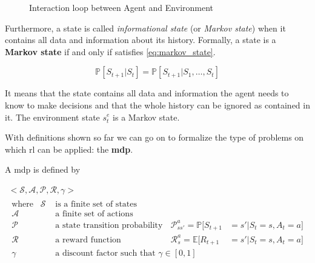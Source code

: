 \begin{figure}
	\centering
	\caption[Interaction loop between Agent and Environment]{Interaction loop between Agent and Environment}
	\label{fig:interactionsAE}
\end{figure}


Furthermore, a state is called \textit{informational state} (or \textit{Markov state}) when it contains all data and information about its history. Formally, a state is a \textbf{Markov state} if and only if satisfies \vref{eq:markov_state}.

\begin{equation} \label{eq:markov_state}
	\mathbb{P}[S_{t+1}| S_t] = \mathbb{P}[S_{t+1} | S_1, \dots, S_t]
\end{equation}

 It means that the state contains all data and information the agent needs to know to make decisions and that the whole history can be ignored as contained in it. The environment state $s_t^e$ is a Markov state.
 
 With definitions shown so far we can go on to formalize the type of problems on which \gls{rl} can be applied: the \textbf{\gls{mdp}}.

 A \gls{mdp} is defined by 

 \begin{gather*} \label{eq:mdp}
 <\mathcal{S}, \mathcal{A}, \mathcal{P}, \mathcal{R}, \gamma>\\
 \begin{aligned}
 	\text{where}\hspace{10pt} \mathcal{S} & \text{ is a finite set of states} \\
 	\mathcal{A} & \text{ a finite set of actions} \\
 	\mathcal{P} & \text{ a state transition probability matrix}
 	& \mathcal{P}_{ss'}^a = \mathbb{P}[S_{t+1}&= s' | S_t = s, A_t = a]\\
 	\mathcal{R} & \text{ a reward function}
 	 	& \mathcal{R}_{s}^a = \mathbb{E}[R_{t+1}&= s' | S_t = s, A_t = a] \\
 	 \gamma & \text{ a discount factor such that } \gamma \in [0,1]
 \end{aligned}
 \end{gather*}


